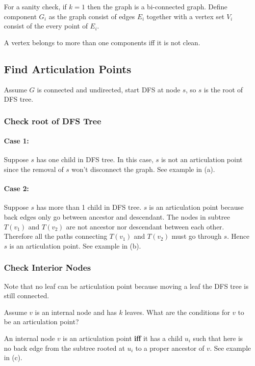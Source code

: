 For a sanity check, if $k = 1$ then the graph is a bi-connected graph. 
Define component $G_i$ as the graph consist of edges $E_i$ together with a 
vertex set $V_i$ consist of the every point of $E_i$.

A vertex belongs to more than one components iff it is not clean.

\subsection{Find Articulation Points}
Assume $G$ is connected and undirected, start DFS at node $s$, so $s$ is the root of DFS tree.

\subsubsection{Check root of DFS Tree}
\paragraph{Case 1:} Suppose $s$ has one child in DFS tree. In this case, $s$ is 
not an articulation point since the removal of $s$ won't disconnect the graph. 
See example in (a).

\paragraph{Case 2:} Suppose $s$ has more than 1 child in DFS tree. $s$ is 
an articulation point because back edges only go between ancestor and 
descendant. The nodes in subtree $T(v_1)$ and $T(v_2)$ are not ancestor nor 
descendant between each other. Therefore all the paths connecting $T(v_1)$ and $T(v_2)$ must go through $s$. Hence $s$ is an articulation point. See example in (b).

\subsubsection{Check Interior Nodes}

Note that no leaf can be articulation point because moving a leaf the DFS tree is still connected.

Assume $v$ is an internal node and has $k$ leaves. What are the conditions for $v$ to be an articulation point? 
\begin{claim}
 An internal node $v$ is an articulation point \textbf{iff} it has a child $u_i$ such that here is no back edge from the subtree rooted at $u_i$ to a proper ancestor of $v$. See example in (c).
\end{claim}

